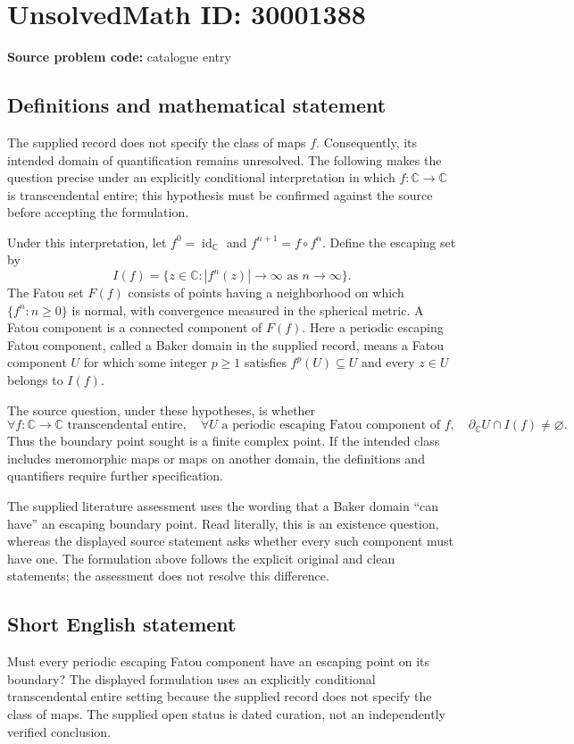 \documentclass[11pt]{article}
\newcommand{\C}{\mathbb{C}}
\begin{document}
\section*{UnsolvedMath ID: 30001388}
\textbf{Source problem code:} catalogue entry
\subsection{Definitions and mathematical statement}
The supplied record does not specify the class of maps \(f\). Consequently, its intended domain of quantification remains unresolved. The following makes the question precise under an explicitly conditional interpretation in which \(f\colon\C\to\C\) is transcendental entire; this hypothesis must be confirmed against the source before accepting the formulation.

Under this interpretation, let \(f^0=\operatorname{id}_{\C}\) and \(f^{n+1}=f\circ f^n\). Define the escaping set by
\[
I(f)=\{z\in\C: |f^n(z)|\longrightarrow\infty\text{ as }n\to\infty\}.
\]
The Fatou set \(F(f)\) consists of points having a neighborhood on which \(\{f^n:n\geq0\}\) is normal, with convergence measured in the spherical metric. A Fatou component is a connected component of \(F(f)\). Here a periodic escaping Fatou component, called a Baker domain in the supplied record, means a Fatou component \(U\) for which some integer \(p\geq1\) satisfies \(f^p(U)\subseteq U\) and every \(z\in U\) belongs to \(I(f)\).

The source question, under these hypotheses, is whether
\[
\forall f\colon\C\to\C\text{ transcendental entire},\quad
\forall U\text{ a periodic escaping Fatou component of }f,\quad
\partial_{\C}U\cap I(f)\neq\varnothing.
\]
Thus the boundary point sought is a finite complex point. If the intended class includes meromorphic maps or maps on another domain, the definitions and quantifiers require further specification.

The supplied literature assessment uses the wording that a Baker domain ``can have'' an escaping boundary point. Read literally, this is an existence question, whereas the displayed source statement asks whether every such component must have one. The formulation above follows the explicit original and clean statements; the assessment does not resolve this difference.
\subsection{Short English statement}
Must every periodic escaping Fatou component have an escaping point on its boundary? The displayed formulation uses an explicitly conditional transcendental entire setting because the supplied record does not specify the class of maps. The supplied open status is dated curation, not an independently verified conclusion.
\end{document}
